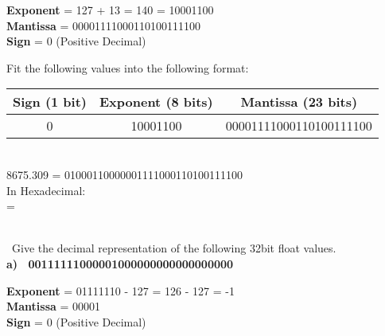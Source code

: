 \documentclass[12pt]{article}
\begin{document}
	\noindent \textbf{Exponent} = 127 + 13 = 140 = 10001100  \\
	\textbf{Mantissa} = 00001111000110100111100  \\
	\textbf{Sign} = 0 (Positive Decimal)  \\
	
	\begin{center}
		Fit the following values into the following format: \vspace{0.25cm} \\
		
		\begin{tabular}{ |c|c|c| }
			\hline
			Sign (1 bit) & Exponent (8 bits) & Mantissa (23 bits) \\
			\hline
			0            & 10001100          & 00001111000110100111100 \\
			\hline
		\end{tabular} \vspace{1cm} \\
		
		
		8675.309 = 01000110000001111000110100111100 \vspace{0.5cm} \\
		
		In Hexadecimal: \\
		=  \\
		  \vspace{2cm} \\
		
	\end{center}
	
	
	
	
	\newpage
	
	
	
	
	\noindent {} 
	\ Give the decimal representation of the following 32bit float values. \vspace{0.5cm} \\
	
	
	\textbf{a) \ 00111111000001000000000000000000} \vspace{0.5cm}
	
	\noindent \textbf{Exponent} = 01111110 - 127 = 126 - 127 = -1 \\
	\textbf{Mantissa} = 00001  \\
	\textbf{Sign} = 0 (Positive Decimal)  \vspace{0.1cm} \\
	
\end{document}
